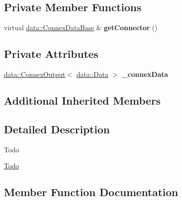 \subsection*{Private Member Functions}
\begin{DoxyCompactItemize}
\item 
\mbox{\label{classfilter_1_1algos_1_1_result_filter_adf545fbdb94413dbf359150f41605cf2}} 
virtual \hyperlink{classfilter_1_1data_1_1_connex_data_base}{data\+::\+Connex\+Data\+Base} \& {\bfseries get\+Connector} ()
\end{DoxyCompactItemize}
\subsection*{Private Attributes}
\begin{DoxyCompactItemize}
\item 
\mbox{\label{classfilter_1_1algos_1_1_result_filter_abd9fa911d67597939e57aa025c9b61bf}} 
\hyperlink{classfilter_1_1data_1_1_connex_output}{data\+::\+Connex\+Output}$<$ \hyperlink{classfilter_1_1data_1_1_data}{data\+::\+Data} $>$ {\bfseries \+\_\+connex\+Data}
\end{DoxyCompactItemize}
\subsection*{Additional Inherited Members}


\subsection{Detailed Description}
\begin{DoxyRefDesc}{Todo}
\item[\hyperlink{todo__todo000013}{Todo}]\end{DoxyRefDesc}


\subsection{Member Function Documentation}
\mbox{\label{classfilter_1_1algos_1_1_result_filter_a0a67e26005d8b32a69fb6e6bec80788c}} 
